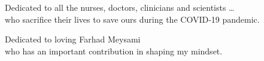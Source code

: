 
\thispagestyle{empty}

\vspace*{3cm}

\begin{center}
  Dedicated to all  the nurses, doctors, clinicians and scientists \dots \\
  who sacrifice their lives
  to save ours
  during the COVID-19 pandemic.\\ \smallskip
\end{center}

\PRLsep


\begin{center}
  Dedicated to loving Farhad Meysami \\
  who has an important contribution in shaping my mindset.
\end{center}

\vfill



